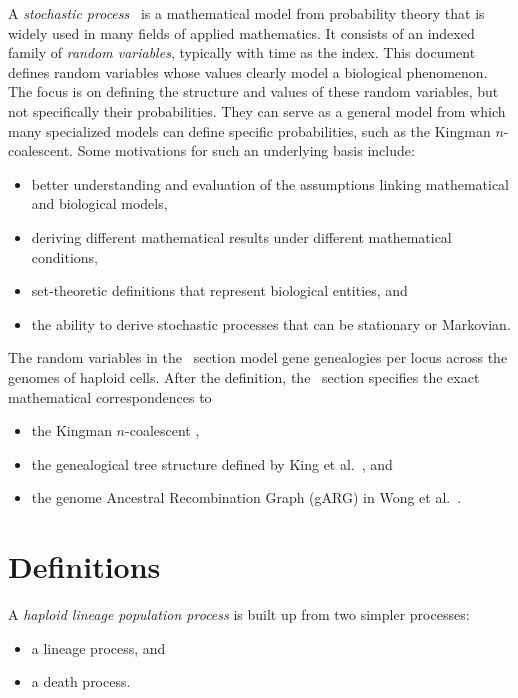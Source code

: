 A \emph{stochastic process}~\cite{ash_probability_2000, pishro_nik_2014} is a
mathematical model from probability theory that is widely used in many fields of applied
mathematics.
It consists of an indexed family of \emph{random variables}, typically with
time as the index.
This document defines random variables whose values clearly model a biological
phenomenon. The focus is on defining the structure and values of these random variables,
but not specifically their probabilities.
They can serve as a general model from which many specialized models can define
specific probabilities, such as the Kingman $n$-coalescent.
Some motivations for such an underlying basis include:
\begin{itemize}
  \item better understanding and evaluation of the assumptions linking mathematical and
    biological models,
  \item deriving different mathematical results under different mathematical conditions,
  \item set-theoretic definitions that represent biological entities, and
  \item the ability to derive stochastic processes that can be stationary or Markovian.
\end{itemize}

The random variables in the ~section model gene genealogies
\cite{wakeley_coalescent_2009} per locus across the genomes of haploid cells.
After the definition,
the ~section specifies the exact mathematical correspondences to
\begin{itemize}
  \item the Kingman $n$-coalescent \cite{kingman_coalescent_1982},
  \item the genealogical tree structure defined by King et al.~\cite{king_exact_2026}, and
  \item the genome Ancestral Recombination Graph (gARG) in Wong et al.~\cite{wong_general_2024}.
\end{itemize}


\section{Definitions}
\label{sec:definitions}

A \emph{haploid lineage population process} is built up from two simpler processes:
\begin{itemize}
  \item a lineage process, and
  \item a death process.
\end{itemize}

